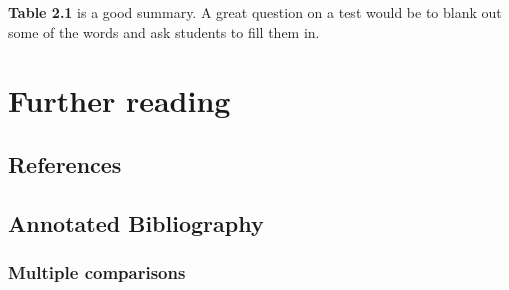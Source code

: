 \documentclass[]{book}
\theoremstyle{definition}
\theoremstyle{definition}
\theoremstyle{definition}
\theoremstyle{remark}
\begin{document}
\textbf{Table 2.1} is a good summary. A great question on a test would
be to blank out some of the words and ask students to fill them in.

\section{Further reading}\label{further-reading-1}

\subsection{References}\label{references-1}

\subsection{Annotated Bibliography}\label{annotated-bibliography-1}

\subsubsection{Multiple comparisons}\label{multiple-comparisons-1}


\end{document}
